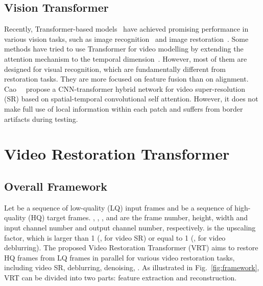 \documentclass[10pt,twocolumn,letterpaper]{article}
\newlength \g
\begin{document}
\subsection{Vision Transformer}
Recently, Transformer-based models~\cite{vaswani2017transformer, shazeer2020geglu, li2021trear, wick2021transformer} have achieved promising performance in various vision tasks, such as image recognition~\cite{dosovitskiy2020ViT, carion2020DETR, li2021localvit, wick2021transformer, liu2021swin, guo2021deep, sun2021boosting, liu2021swin, liu2021transformer, liu2020deep} and image restoration~\cite{chen2021IPT, wang2021uformer, liang21swinir}. Some methods have tried to use Transformer for video modelling by extending the attention mechanism to the temporal dimension~\cite{bertasius2021timesformer, arnab2021vivit, neimark2021videotransfomernetwork, liu2021videoSwinT, li2021trear}. However, most of them are designed for visual recognition, which are fundamentally different from restoration tasks. They are more focused on feature fusion than on alignment. Cao~\etal~\cite{cao2021videosr} propose a CNN-transformer hybrid network for video super-resolution (SR) based on spatial-temporal convolutional self attention. However, it does not make full use of local information within each patch and suffers from border artifacts during testing.



\section{Video Restoration Transformer}
\subsection{Overall Framework}
\label{sec:overall}
Let  be a sequence of low-quality (LQ) input frames and  be a sequence of high-quality (HQ) target frames. , , ,  and  are the frame number, height, width and input channel number and output channel number, respectively.  is the upscaling factor, which is larger than 1 (\eg, for video SR) or equal to 1 (\eg, for video deblurring). The proposed Video Restoration Transformer (VRT) aims to restore  HQ frames from  LQ frames in parallel for various video restoration tasks, including video SR, deblurring, denoising, \etc. As illustrated in Fig.~\ref{fig:framework}, VRT can be divided into two parts: feature extraction and reconstruction.

\vspace{-0.4cm}
\end{document}
